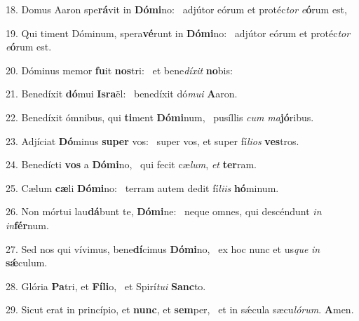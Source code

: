 18. Domus Aaron spe\textbf{rá}vit in \textbf{Dó}\textbf{mi}no: \ast\  adjútor eórum et protéc\textit{tor} \textit{e}\textbf{ó}rum est,\

19. Qui timent Dóminum, spera\textbf{vé}runt in \textbf{Dó}\textbf{mi}no: \ast\  adjútor eórum et protéc\textit{tor} \textit{e}\textbf{ó}rum est.\

20. Dóminus memor \textbf{fu}it \textbf{nos}tri: \ast\  et bene\textit{dí}\textit{xit} \textbf{no}bis:\

21. Benedíxit \textbf{dó}mui \textbf{Is}\textbf{ra}ël: \ast\  benedíxit dó\textit{mu}\textit{i} \textbf{A}aron.\

22. Benedíxit ómnibus, qui \textbf{ti}ment \textbf{Dó}\textbf{mi}num, \ast\  pusíllis \textit{cum} \textit{ma}\textbf{jó}ribus.\

23. Adjíciat \textbf{Dó}minus \textbf{su}\textbf{per} vos: \ast\  super vos, et super fí\textit{li}\textit{os} \textbf{ves}tros.\

24. Benedícti \textbf{vos} a \textbf{Dó}\textbf{mi}no, \ast\  qui fecit cæ\textit{lum}, \textit{et} \textbf{ter}ram.\

25. Cælum \textbf{cæ}li \textbf{Dó}\textbf{mi}no: \ast\  terram autem dedit fí\textit{li}\textit{is} \textbf{hó}minum.\

26. Non mórtui lau\textbf{dá}bunt te, \textbf{Dó}\textbf{mi}ne: \ast\  neque omnes, qui descéndunt \textit{in} \textit{in}\textbf{fér}num.\

27. Sed nos qui vívimus, bene\textbf{dí}cimus \textbf{Dó}\textbf{mi}no, \ast\  ex hoc nunc et us\textit{que} \textit{in} \textbf{sǽ}culum.\

28. Glória \textbf{Pa}tri, et \textbf{Fí}\textbf{li}o, \ast\  et Spirí\textit{tu}\textit{i} \textbf{Sanc}to.\

29. Sicut erat in princípio, et \textbf{nunc}, et \textbf{sem}per, \ast\  et in sǽcula sæcu\textit{ló}\textit{rum}. \textbf{A}men.\

